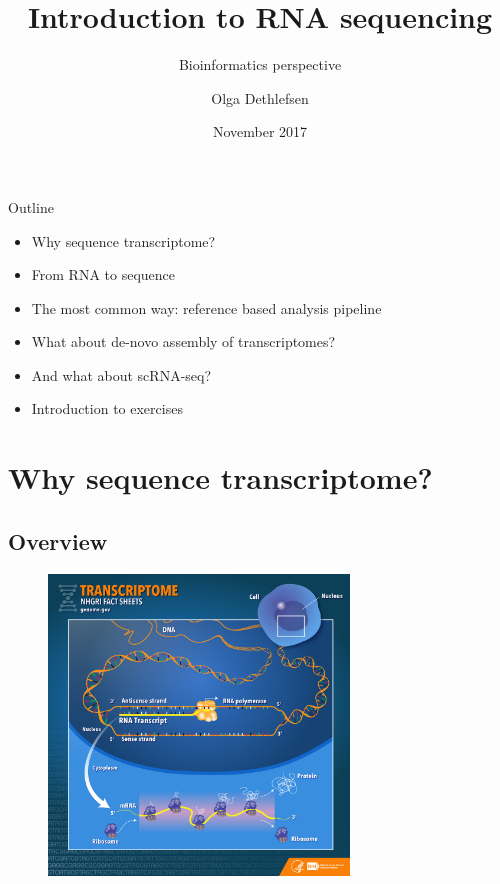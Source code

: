 \documentclass{beamer}\usepackage[]{graphicx}\usepackage[]{color}
\title[RNA-seq]{Introduction to RNA sequencing}
\subtitle{Bioinformatics perspective}
\author[Olga]{Olga Dethlefsen}
\institute[NBIS]{NBIS, National Bioinformatics Infrastructure Sweden\\}
\date[November 2017]{November 2017}
\begin{document}
\begin{frame}
\titlepage
\end{frame}
\logo{}


\begin{frame}
\begin{block}{Outline}
\begin{itemize}
  \item Why sequence transcriptome?
  \item From RNA to sequence
  \item The most common way: reference based analysis pipeline
  \item What about de-novo assembly of transcriptomes?
  \item And what about scRNA-seq?
  \item Introduction to exercises
 \end{itemize}
\end{block}
\end{frame}

\section{Why sequence transcriptome?}

 
\subsection{Overview}
\begin{frame}
\begin{center}
\begin{figure}
\includegraphics[height=8cm]{Images/transcriptome.jpg}
\end{figure}
\end{center}
\end{frame}
\end{document}
